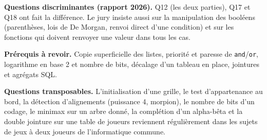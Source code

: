 \documentclass[11pt,a4paper]{article}
\begin{document}
\textbf{Questions discriminantes (rapport 2026).} Q12 (les deux parties), Q17 et Q18 ont fait la différence. Le jury insiste aussi sur la manipulation des booléens (parenthèses, lois de De Morgan, renvoi direct d'une condition) et sur les fonctions qui doivent renvoyer une valeur dans tous les cas.

\textbf{Prérequis à revoir.} Copie superficielle des listes, priorité et paresse de \texttt{and}/\texttt{or}, logarithme en base 2 et nombre de bits, décalage d'un tableau en place, jointures et agrégats SQL.

\textbf{Questions transposables.} L'initialisation d'une grille, le test d'appartenance au bord, la détection d'alignements (puissance 4, morpion), le nombre de bits d'un codage, le minimax sur un arbre donné, la complétion d'un alpha-bêta et la double jointure sur une table de joueurs reviennent régulièrement dans les sujets de jeux à deux joueurs de l'informatique commune.
\end{document}

